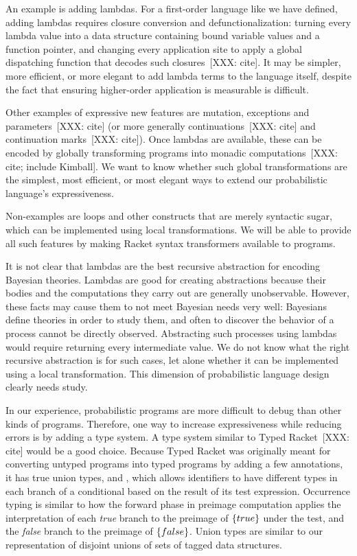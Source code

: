 An example is adding lambdas.
For a first-order language like we have defined, adding lambdas requires closure conversion and defunctionalization: turning every lambda value into a data structure containing bound variable values and a function pointer, and changing every application site to apply a global dispatching function that decodes such closures~[XXX: cite].
It may be simpler, more efficient, or more elegant to add lambda terms to the language itself, despite the fact that ensuring higher-order application is measurable is difficult.

Other examples of expressive new features are mutation, exceptions and parameters~[XXX: cite] (or more generally continuations~[XXX: cite] and continuation marks~[XXX: cite]).
Once lambdas are available, these can be encoded by globally transforming programs into monadic computations~[XXX: cite; include Kimball].
We want to know whether such global transformations are the simplest, most efficient, or most elegant ways to extend our probabilistic language's expressiveness.

Non-examples are loops and other constructs that are merely syntactic sugar, which can be implemented using local transformations.
We will be able to provide all such features by making Racket syntax transformers available to programs.

It is not clear that lambdas are the best recursive abstraction for encoding Bayesian theories.
Lambdas are good for creating abstractions because their bodies and the computations they carry out are generally unobservable.
However, these facts may cause them to not meet Bayesian needs very well: Bayesians define theories in order to study them, and often to discover the behavior of a process cannot be directly observed.
Abstracting such processes using lambdas would require returning every intermediate value.
We do not know what the right recursive abstraction is for such cases, let alone whether it can be implemented using a local transformation.
This dimension of probabilistic language design clearly needs study.

In our experience, probabilistic programs are more difficult to debug than other kinds of programs.
Therefore, one way to increase expressiveness while reducing errors is by adding a type system.
A type system similar to Typed Racket~[XXX: cite] would be a good choice.
Because Typed Racket was originally meant for converting untyped programs into typed programs by adding a few annotations, it has true union types, and , which allows identifiers to have different types in each branch of a conditional based on the result of its test expression.
Occurrence typing is similar to how the forward phase in preimage computation applies the interpretation of each \emph{true} branch to the preimage of $\{{true}\}$ under the test, and the \emph{false} branch to the preimage of $\{{false}\}$.
Union types are similar to our representation of disjoint unions of sets of tagged data structures.

